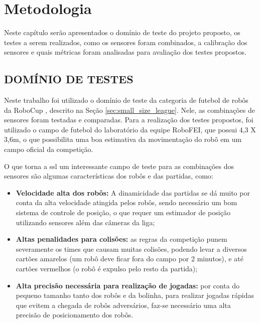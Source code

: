 \documentclass[acronym, symbols, table, deposito]{fei}
\begin{document}
\chapter{Metodologia}\label{sec:metodologia}

	Neste capítulo serão apresentados o domínio de teste do projeto proposto, os testes a serem realizados, como os sensores foram combinados, a calibração dos sensores e quais métricas foram analisadas para avaliação dos testes propostos.
	
	\section{DOMÍNIO DE TESTES} \label{sec:dominio_de_testes}
	
		Neste trabalho foi utilizado o domínio de teste da categoria  de futebol de robôs da RoboCup \cite{RoboCup}, descrito na Seção \ref{sec:small_size_league}. Nele, as combinações de sensores foram testadas e comparadas. Para a realização dos testes propostos, foi utilizado o campo de futebol do laboratório da equipe RoboFEI, que possui 4,3 X 3,6m, o que possibilita uma boa estimativa da movimentação do robô em um campo oficial da competição.
		
		O que torna a \acrshort{ssl} um interessante campo de teste para as combinações dos sensores são algumas características dos robôs e das partidas, como:
		
		\begin{itemize}
			\item \textbf{Velocidade alta dos robôs:} A dinamicidade das partidas se dá muito por conta da alta velocidade atingida pelos robôs, sendo necessário um bom sistema de controle de posição, o que requer um estimador de posição utilizando sensores além das câmeras da liga;
			
			\item \textbf{Altas penalidades para colisões:} as regras da competição punem severamente os times que causam muitas colisões, podendo levar a diversos cartões amarelos (um robô deve ficar fora do campo por 2 minutos), e até cartões vermelhos (o robô é expulso pelo resto da partida);
			
			\item \textbf{Alta precisão necessária para realização de jogadas:} por conta do pequeno tamanho tanto dos robôs e da bolinha, para realizar jogadas rápidas que evitem a chegada de robôs adversários, faz-se necessário uma alta precisão de posicionamento dos robôs.
		\end{itemize}
		
\end{document}
